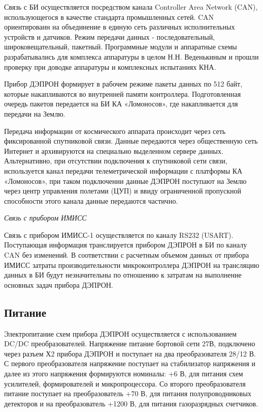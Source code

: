 Связь с БИ осуществляется посредством канала Controller Area Network (CAN), использующегося в качестве стандарта промышленных сетей. CAN ориентированн на объединение в единую сеть различных исполнительных устройств и датчиков. Режим передачи данных - последовательный, широковещательный, пакетный. Программные модули и аппаратные схемы разрабатывались для комплекса аппаратуры в целом Н.Н. Веденькиным и прошли проверку при доводке аппаратуры и комплексных испытаниях КНА.

Прибор ДЭПРОН формирует в рабочем режиме пакеты данных по 512 байт, которые накапливаются во внутренней памяти контроллера. Подготовленная очередь пакетов  передается на БИ КА «Ломоносов», где накапливается для передачи на Землю.

Передача информации от космического аппарата происходит через сеть фиксированной спутниковой связи. Данные передаются через общественную сеть Интернет и архивируются на специально выделенном сервере данных. Альтернативно, при отсутствии подключения к спутниковой сети связи, используется канал передачи телеметрической информации с платформы КА «Ломоносов», при таком подключении данные ДЭПРОН поступают на Землю через центр управления полетами (ЦУП) и ввиду ограниченной пропускной способности этого канала данные передаются частично.

\emph{Связь с прибором ИМИСС}

Связь с прибором ИМИСС-1 осуществляется по каналу RS232 (USART). Поступающая информация транслируется прибором ДЭПРОН в БИ по каналу CAN без изменений. В соответствии с расчетным объемом данных от прибора ИМИСС затраты производительности микроконтроллера ДЭПРОН на трансляцию данных в БИ будут незначительны по отношению к затратам на выполнение основных задач прибора ДЭПРОН.

\subsection{Питание}

Электропитание схем прибора ДЭПРОН осуществляется с использованием DC/DC преобразователей. Напряжение питание бортовой сети 27В, подключено через разъем Х2 прибора ДЭПРОН и поступает на два преобразователя 28/12 В. С первого преобразователя напряжение поступает на стабилизатор напряжения и далее из этого напряжения формируются номиналы: +6 В, для питания схем усилителей, формирователей и микропроцессора. Со второго преобразователя питание поступает на преобразователь +70 В, для питания полупроводниковых детекторов и на преобразователь +1200 В, для питания газоразрядных счетчиков. 

